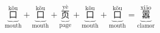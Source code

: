 \[ \underbrace{\overset{\text{kǒu}}{\text{口}}}_{\text{mouth}} + \underbrace{\overset{\text{kǒu}}{\text{口}}}_{\text{mouth}} + \underbrace{\overset{\text{yè}}{\text{页}}}_{\text{page}} + \underbrace{\overset{\text{kǒu}}{\text{口}}}_{\text{mouth}} + \underbrace{\overset{\text{kǒu}}{\text{口}}}_{\text{mouth}} = \underbrace{\overset{\text{xiāo}}{\text{嚣}}}_{\text{clamor}} \]
